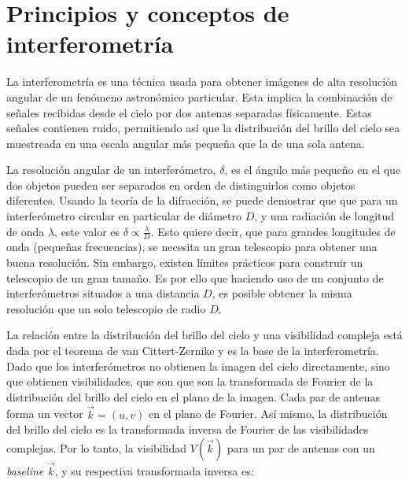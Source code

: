 \section{Principios y conceptos de interferometría}

La interferometría es una técnica usada para obtener imágenes de alta resolución angular de un fenómeno astronómico particular. Esta implica la combinación de señales recibidas desde el cielo por dos antenas separadas físicamente. Estas señales contienen ruido, permitiendo así que la distribución del brillo del cielo sea muestreada en una escala angular más pequeña que la de una sola antena.

La resolución angular de un interferómetro, $\delta$, es el ángulo más pequeño en el que dos objetos pueden ser separados en orden de distinguirlos como objetos diferentes. Usando la teoría de la difracción, se puede demostrar que que para un interferómetro circular en particular de diámetro $D$, y una radiación de longitud de onda $\lambda$, este valor es $\delta \propto \frac{\lambda}{D}$. Esto quiere decir, que para grandes longitudes de onda (pequeñas frecuencias), se necesita un gran telescopio para obtener una buena resolución. Sin embargo, existen límites prácticos para construir un telescopio de un gran tamaño. Es por ello que haciendo uso de un conjunto de interferómetros situados a una distancia $D$, es posible obtener la misma resolución que un solo telescopio de radio $D$.



La relación entre la distribución del brillo del cielo y una visibilidad compleja está dada por el teorema de van Cittert-Zernike \citep{zernike} y es la base de la interferometría. Dado que los interferómetros no obtienen la imagen del cielo directamente, sino que obtienen visibilidades, que son que son la transformada de Fourier de la distribución del brillo del cielo en el plano de la imagen. Cada par de antenas forma un vector $\vec{k} = (u,v)$ en el plano de Fourier. Así mismo, la distribución del brillo del cielo es la transformada inversa de Fourier de las visibilidades complejas. Por lo tanto, la visibilidad $V(\vec{k})$ para un par de antenas con un \textit{baseline} $\vec{k}$, y su respectiva transformada inversa es:


